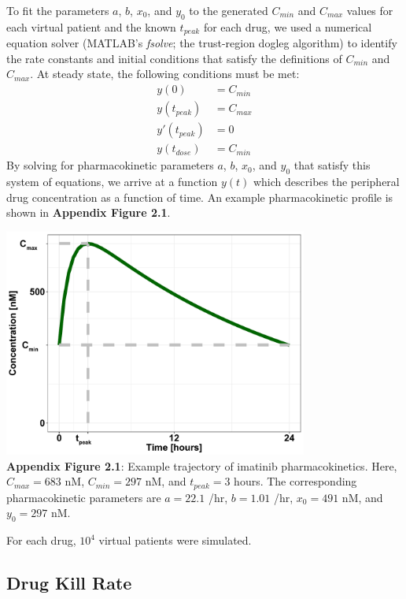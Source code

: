 \documentclass{article}
\begin{document}
To fit the parameters $a$, $b$, $x_0$, and $y_0$ to the generated $C_{min}$ and $C_{max}$ values for each virtual patient and the known $t_{peak}$ for each drug, we used a numerical equation solver (MATLAB's \textit{fsolve}; the trust-region dogleg algorithm) to identify the rate constants and initial conditions that satisfy the definitions of $C_{min}$ and $C_{max}$.  At steady state, the following conditions must be met:
\begin{equation}
\begin{split}
y(0) &= C_{min} \\
y(t_{peak}) &= C_{max} \\
y'(t_{peak}) &= 0 \\
y(t_{dose}) &= C_{min}
\end{split}
\end{equation}
By solving for pharmacokinetic parameters $a$, $b$, $x_0$, and $y_0$ that satisfy this system of equations, we arrive at a function $y(t)$ which describes the peripheral drug concentration as a function of time.  An example pharmacokinetic profile is shown in \textbf{Appendix Figure 2.1}.

\begin{center}
\includegraphics[width=0.75\textwidth]{PKprofile}
\\
\textbf{Appendix Figure 2.1}: Example trajectory of imatinib pharmacokinetics. Here, $C_{max} = 683$ nM, $C_{min} = 297$ nM, and $t_{peak} = 3$ hours.  The corresponding pharmacokinetic parameters are $a=22.1$ /hr, $b=1.01$ /hr, $x_0=491$ nM, and $y_0=297$ nM.
\end{center}

For each drug, $10^4$ virtual patients were simulated.

\subsection{Drug Kill Rate}
\end{document}
